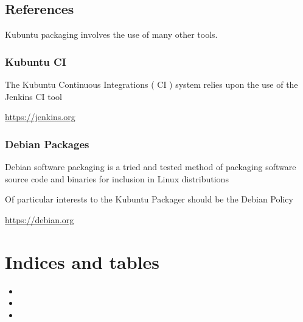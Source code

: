 \documentclass[letterpaper,10pt,english]{sphinxmanual}
\begin{document}
\section{References}
\label{docs/appendix/references:references}\label{docs/appendix/references::doc}
Kubuntu packaging involves the use of many other tools.


\subsection{Kubuntu CI}
\label{docs/appendix/references:kubuntu-ci}
The Kubuntu Continuous Integrations ( CI ) system relies upon the use of the Jenkins CI tool

\url{https://jenkins.org}


\subsection{Debian Packages}
\label{docs/appendix/references:debian-packages}
Debian software packaging is a tried and tested method of packaging software source code and binaries for inclusion in Linux distributions

Of particular interests to the Kubuntu Packager should be the Debian Policy

\url{https://debian.org}


\chapter{Indices and tables}
\label{index:indices-and-tables}\begin{itemize}
\item {} 

\item {} 

\item {} 

\end{itemize}



\renewcommand{\indexname}{Index}
\printindex
\end{document}
